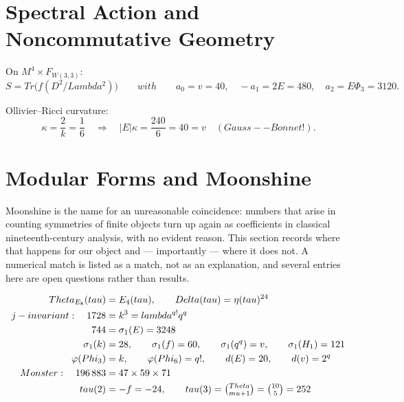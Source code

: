\documentclass[12pt,a4paper]{article}
\def\mathrm#1{#1}%
\def\text#1{#1}%
\def\Delta{Delta}%
\def\lambda{lambda}%
\def\Lambda{Lambda}%
\def\mu{mu}%
\def\Phi#1{Phi#1}%
\def\tau{tau}%
\def\Theta{Theta}%
\def\cdot{ }%
\theoremstyle{definition}
\renewcommand{\Tr}{\mathrm{Tr}}
\newcommand{\Phithree}{\Phi_3}
\begin{document}
\section{Spectral Action and Noncommutative Geometry}
\label{sec:spectral}

On $M^4\times F_{W(3,3)}$:
\begin{equation}
S = \Tr\bigl(f(D^2/\Lambda^2)\bigr)
\qquad\text{with}\qquad
a_0 = v = 40,\quad
-a_1 = 2E = 480,\quad
a_2 = E\Phithree = 3120.
\end{equation}

Ollivier--Ricci curvature:
\begin{equation}
\kappa = \frac{2}{k} = \frac{1}{6}
\quad\Longrightarrow\quad
|E|\cdot\kappa = \frac{240}{6} = 40 = v
\quad\text{(Gauss--Bonnet!)}.
\end{equation}


\section{Modular Forms and Moonshine}

\begin{plainbox}
Moonshine is the name for an unreasonable coincidence: numbers that arise in
counting symmetries of finite objects turn up again as coefficients in classical
nineteenth-century analysis, with no evident reason. This section records where that
happens for our object and --- importantly --- where it does not. A numerical match is
listed as a match, not as an explanation, and several entries here are open questions
rather than results.
\end{plainbox}

\label{sec:moonshine}

\begin{equation}
\begin{aligned}
\Theta_{E_8}(\tau) &= E_4(\tau), \qquad \Delta(\tau) = \eta(\tau)^{24} \\
j\text{-invariant:}\quad 1728 &= k^3 = \lambda^{q!}\cdot q^q \\
744 &= \sigma_1(E) = 3\cdot 248 \\
\sigma_1(k) &= 28, \qquad \sigma_1(f) = 60, \qquad \sigma_1(q^q) = v, \qquad \sigma_1(H_1) = 121 \\
\varphi(\Phi_3) &= k, \qquad \varphi(\Phi_6) = q!, \qquad d(E) = 20, \qquad d(v) = 2^q \\
\text{Monster:}\quad 196\,883 &= 47\times 59\times 71 \\
\tau(2) &= -f = -24, \qquad
\tau(3) = \tbinom{\Theta}{\mu+1} = \tbinom{10}{5} = 252
\end{aligned}
\end{equation}
\end{document}
